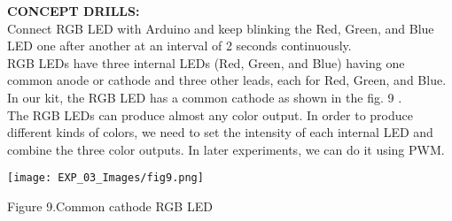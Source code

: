 \documentclass[12pt,a4paper]{article}
\begin{document}
\begin{justify}
\begin{enumerate}
\end{enumerate}

\textbf{\large CONCEPT DRILLS:}\\[3pt]
Connect RGB LED with Arduino and keep blinking the Red, Green, and Blue LED one after another at an interval of 2 seconds continuously.\\ 
RGB LEDs have three internal LEDs (Red, Green, and Blue) having one common anode or cathode and three other leads, each for Red, Green, and Blue. In our kit, the RGB LED has a common cathode as shown in the fig. 9 .\\
The RGB LEDs can produce almost any color output. In order to produce different kinds of colors, we need to set the intensity of each internal LED and combine the three color outputs. In later experiments, we can do it using PWM.\\

\begin{center} 
\texttt{[image: EXP\_03\_Images/fig9.png]}
\end{center}
\begin{center} {Figure 9.Common cathode RGB LED}\end{center}


\end{justify}
\end{document}
